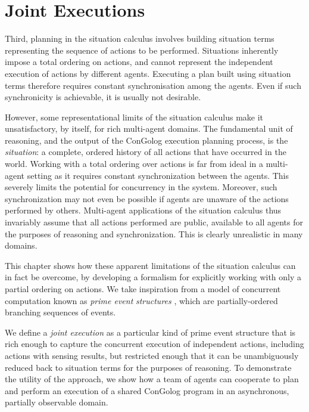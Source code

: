 

\chapter{Joint Executions}

\label{ch:jointexec}

Third, planning in the situation calculus involves building situation
terms representing the sequence of actions to be performed. Situations
inherently impose a total ordering on actions, and cannot represent
the independent execution of actions by different agents. Executing
a plan built using situation terms therefore requires constant synchronisation
among the agents. Even if such synchronicity is achievable, it is
usually not desirable.

However, some representational limits of the situation calculus make
it unsatisfactory, by itself, for rich multi-agent domains. The fundamental
unit of reasoning, and the output of the ConGolog execution planning
process, is the \emph{situation}: a complete, ordered history of all
actions that have occurred in the world. Working with a total ordering
over actions is far from ideal in a multi-agent setting as it requires
constant synchronization between the agents. This severely limits
the potential for concurrency in the system. Moreover, such synchronization
may not even be possible if agents are unaware of the actions performed
by others. Multi-agent applications of the situation calculus thus
invariably assume that all actions performed are public, available
to all agents for the purposes of reasoning and synchronization. This
is clearly unrealistic in many domains.

This chapter shows how these apparent limitations of the situation
calculus can in fact be overcome, by developing a formalism for explicitly
working with only a partial ordering on actions. We take inspiration
from a model of concurrent computation known as \emph{prime event}
\emph{structures} \citep{npw79event_structures}, which are partially-ordered
branching sequences of events.

We define a \emph{joint execution} as a particular kind of prime event
structure that is rich enough to capture the concurrent execution
of independent actions, including actions with sensing results, but
restricted enough that it can be unambiguously reduced back to situation
terms for the purposes of reasoning. To demonstrate the utility of
the approach, we show how a team of agents can cooperate to plan and
perform an execution of a shared ConGolog program in an asynchronous,
partially observable domain.

